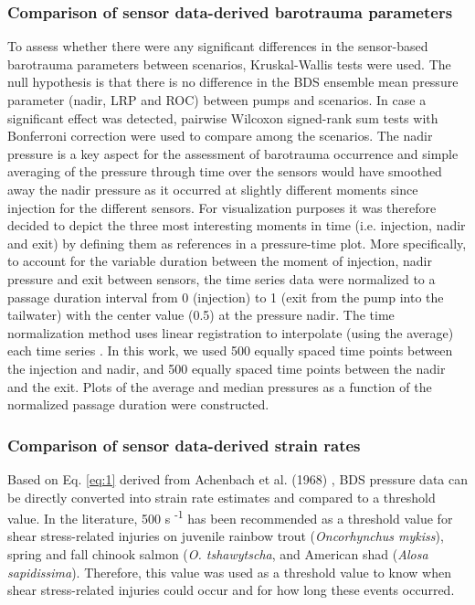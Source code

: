 \documentclass[fleqn,10pt]{wlscirep}
\begin{document}

\subsubsection*{Comparison of sensor data-derived barotrauma parameters}
To assess whether there were any significant differences in the sensor-based barotrauma parameters between scenarios, Kruskal-Wallis tests were used. The null hypothesis is that there is no difference in the BDS ensemble mean pressure parameter (nadir, LRP and ROC) between pumps and scenarios. In case a significant effect was detected, pairwise Wilcoxon signed-rank sum tests with Bonferroni correction were used to compare among the scenarios. The nadir pressure is a key aspect for the assessment of barotrauma occurrence and simple averaging of the pressure through time over the sensors would have smoothed away the nadir pressure as it occurred at slightly different moments since injection for the different sensors. For visualization purposes it was therefore decided to depict the three most interesting moments in time (i.e. injection, nadir and exit) by defining them as references in a pressure-time plot.  More specifically, to account for the variable duration between the moment of injection, nadir pressure and exit between sensors, the time series data were normalized to a passage duration interval from 0 (injection) to 1 (exit from the pump into the tailwater) with the center value (0.5) at the pressure nadir. The time normalization method uses linear registration to interpolate (using the average) each time series \cite{Pataky2022SimultaneouslyMapping}. In this work, we used 500 equally spaced time points between the injection and nadir, and 500 equally spaced time points between the nadir and the exit. Plots of the average and median pressures as a  function of the normalized passage duration were constructed.

\subsubsection*{Comparison of sensor data-derived strain rates}

Based on Eq. \ref{eq:1} derived from Achenbach et al. (1968) \cite{Achenbach1968DistributionRe=1000000}, BDS pressure data can be directly converted into strain rate estimates and compared to a threshold value. In the literature, 500 s \textsuperscript{-1} has been recommended as a threshold value for shear stress-related injuries \cite{Neitzel2000LaboratoryFish} on juvenile rainbow trout (\textit{Oncorhynchus mykiss}), spring and fall chinook salmon (\textit{O. tshawytscha}, and American shad (\textit{Alosa sapidissima}). Therefore, this value was used as a threshold value to know when shear stress-related injuries could occur and for how long these events occurred.
 
\end{document}
